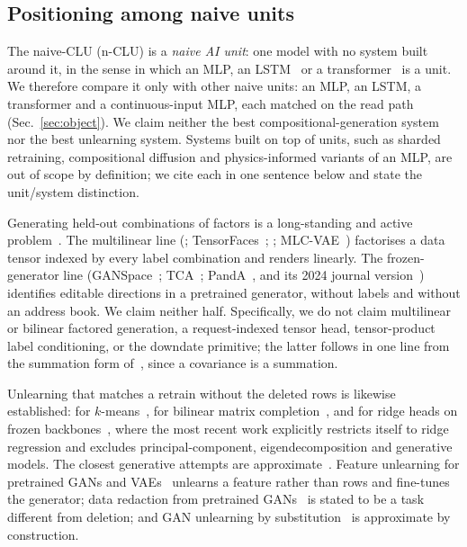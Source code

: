 \documentclass{article} %
\begin{document}
\subsection{Positioning among naive units}
\label{sec:positioning}

The naive-CLU (n-CLU) is a \emph{naive AI unit}: one model with no system built around it, in the sense
in which an MLP, an LSTM~\citep{hochreiter_long_1997} or a transformer~\citep{vaswani_attention_2023} is a unit. We therefore compare it only with other naive
units: an MLP, an LSTM, a transformer and a continuous-input MLP, each matched on the read path
(Sec.~\ref{sec:object}). We claim neither the best compositional-generation system nor the best
unlearning system. Systems built on top of units, such as sharded retraining, compositional
diffusion and physics-informed variants of an MLP, are out of scope by definition; we cite each
in one sentence below and state the unit/system distinction.

Generating held-out combinations of factors is a long-standing and active problem~\citep{du_compositional_2020,avidan_compositional_2022}. The multilinear line (\citealp{tenenbaum_separating_2000};
TensorFaces~\citep{goos_multilinear_2002}; \citealp{vlasic_face_2005}; MLC-VAE~\citep{georgopoulos_multilinear_2020}) factorises a data tensor
indexed by every label combination and renders linearly. The frozen-generator line
(GANSpace~\citep{harkonen_ganspace_2020}; TCA~\citep{oldfield_tensor_2021}; PandA~\citep{oldfield_panda_2023}, and its 2024 journal version~\citep{oldfield_bilinear_2024}) identifies editable directions in a
pretrained generator, without labels and without an address book. We claim neither half.
Specifically, we do not claim multilinear or bilinear factored generation, a request-indexed
tensor head, tensor-product label conditioning, or the downdate primitive; the latter follows
in one line from the summation form of~\citet{cao_towards_2015}, since a covariance is a summation.

Unlearning that matches a retrain without the deleted rows is likewise established: for $k$-means~\citep{ginart_making_2019}, for bilinear
matrix completion~\citep{xu_netflix_2023}, and for ridge heads on frozen backbones~\citep{ceci_exact_2027}, where the most recent work
explicitly restricts itself to ridge regression and excludes principal-component,
eigendecomposition and generative models. The closest generative attempts are approximate~\citep{kong_approximate_2022}.
Feature unlearning for pretrained GANs and VAEs~\citep{moon_feature_2024} unlearns a feature rather than rows and
fine-tunes the generator; data redaction from pretrained GANs~\citep{kong_data_2023} is stated to be a task different
from deletion; and GAN unlearning by substitution~\citep{sun_generative_2025} is approximate by construction.
\end{document}
